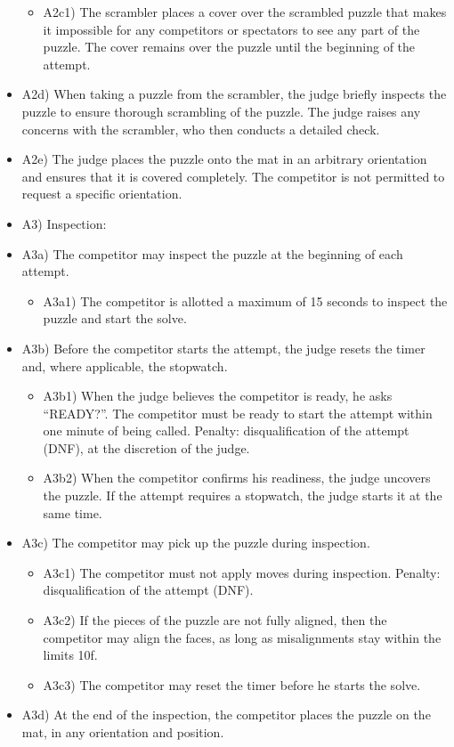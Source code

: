 \begin{itemize}
  \begin{itemize}
  \item
    A2c1) The scrambler places a cover over the scrambled puzzle that
    makes it impossible for any competitors or spectators to see any
    part of the puzzle. The cover remains over the puzzle until the
    beginning of the attempt.
  \end{itemize}
\item
  A2d) When taking a puzzle from the scrambler, the judge briefly
  inspects the puzzle to ensure thorough scrambling of the puzzle. The
  judge raises any concerns with the scrambler, who then conducts a
  detailed check.
\item
  A2e) The judge places the puzzle onto the mat in an arbitrary
  orientation and ensures that it is covered completely. The competitor
  is not permitted to request a specific orientation.
\item
  A3) Inspection:
\item
  A3a) The competitor may inspect the puzzle at the beginning of each
  attempt.

  \begin{itemize}
  \item
    A3a1) The competitor is allotted a maximum of 15 seconds to inspect
    the puzzle and start the solve.
  \end{itemize}
\item
  A3b) Before the competitor starts the attempt, the judge resets the
  timer and, where applicable, the stopwatch.

  \begin{itemize}
  \item
    A3b1) When the judge believes the competitor is ready, he asks
    ``READY?''. The competitor must be ready to start the attempt within
    one minute of being called. Penalty: disqualification of the attempt
    (DNF), at the discretion of the judge.
  \item
    A3b2) When the competitor confirms his readiness, the judge uncovers
    the puzzle. If the attempt requires a stopwatch, the judge starts it
    at the same time.
  \end{itemize}
\item
  A3c) The competitor may pick up the puzzle during inspection.

  \begin{itemize}
  \item
    A3c1) The competitor must not apply moves during inspection.
    Penalty: disqualification of the attempt (DNF).
  \item
    A3c2) If the pieces of the puzzle are not fully aligned, then the
    competitor may align the faces, as long as misalignments stay within
    the limits 10f.
  \item
    A3c3) The competitor may reset the timer before he starts the solve.
  \end{itemize}
\item
  A3d) At the end of the inspection, the competitor places the puzzle on
  the mat, in any orientation and position.


\end{itemize}
